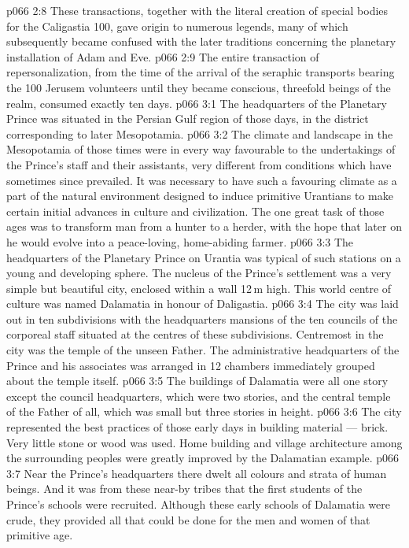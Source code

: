 \vs p066 2:8 \pc These transactions, together with the literal creation of special bodies for the Caligastia 100, gave origin to numerous legends, many of which subsequently became confused with the later traditions concerning the planetary installation of Adam and Eve.
\vs p066 2:9 The entire transaction of repersonalization, from the time of the arrival of the seraphic transports bearing the 100 Jerusem volunteers until they became conscious, threefold beings of the realm, consumed exactly ten days.
\vs p066 3:1 The headquarters of the Planetary Prince was situated in the Persian Gulf region of those days, in the district corresponding to later Mesopotamia.
\vs p066 3:2 The climate and landscape in the Mesopotamia of those times were in every way favourable to the undertakings of the Prince’s staff and their assistants, very different from conditions which have sometimes since prevailed. It was necessary to have such a favouring climate as a part of the natural environment designed to induce primitive Urantians to make certain initial advances in culture and civilization. The one great task of those ages was to transform man from a hunter to a herder, with the hope that later on he would evolve into a peace\hyp{}loving, home\hyp{}abiding farmer.
\vs p066 3:3 \pc The headquarters of the Planetary Prince on Urantia was typical of such stations on a young and developing sphere. The nucleus of the Prince’s settlement was a very simple but beautiful city, enclosed within a wall 12\,m high. This world centre of culture was named Dalamatia in honour of Daligastia.
\vs p066 3:4 The city was laid out in ten subdivisions with the headquarters mansions of the ten councils of the corporeal staff situated at the centres of these subdivisions. Centremost in the city was the temple of the unseen Father. The administrative headquarters of the Prince and his associates was arranged in 12 chambers immediately grouped about the temple itself.
\vs p066 3:5 The buildings of Dalamatia were all one story except the council headquarters, which were two stories, and the central temple of the Father of all, which was small but three stories in height.
\vs p066 3:6 The city represented the best practices of those early days in building material --- brick. Very little stone or wood was used. Home building and village architecture among the surrounding peoples were greatly improved by the Dalamatian example.
\vs p066 3:7 \pc Near the Prince’s headquarters there dwelt all colours and strata of human beings. And it was from these near\hyp{}by tribes that the first students of the Prince’s schools were recruited. Although these early schools of Dalamatia were crude, they provided all that could be done for the men and women of that primitive age.
